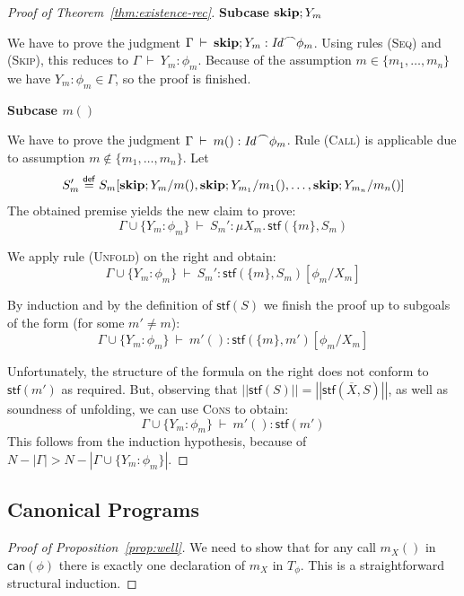 \documentclass[10pt,a4paper]{amsart}
\theoremstyle{definition}
\newcommand{\defeq}{\stackrel{\mathsf{def}}{=}}
\newcommand{\fdenot}[1]{\left|\!\left|#1\right|\!\right|}
\newcommand{\chop}[0]{\raisebox{1ex}{$\frown$}}
\newcommand{\stfs}[1]{\mathsf{stf} (#1)}
\newcommand{\stfh}[2]{\mathsf{stf}(#1, #2)}
\newcommand{\can}[1]{\mathsf{can} (#1)}
\newcommand{\Skip}{\mbox{\bf skip}}
\newcommand{\judge}[2]{#1 : #2}
\newcommand{\sequent}[2]{#1 \>\vdash\> #2}
\begin{document}
\begin{proof}[Proof of Theorem~\ref{thm:existence-rec}]
  \noindent\textbf{Subcase $\Skip;Y_m$} 

  We have to prove the judgment
  $\sequent{\Gamma}{\judge{\Skip;Y_m}{\mathit{Id} \chop \phi_m}}$.
  Using rules (\textsc{Seq}) and (\textsc{Skip}), this reduces to
  $\sequent{\Gamma}{\judge{Y_m}{\phi_m}}$.  Because of the assumption
  $m\in\{m_1,\ldots,m_n\}$ we have $\judge{Y_m}{\phi_m}\in\Gamma$, so
  the proof is finished.
  
  \noindent\textbf{Subcase $m()$}

  We have to prove the judgment
  $\sequent{\Gamma}{\judge{m()}{\mathit{Id}\chop\phi_m}}$.  Rule
  (\textsc{Call}) is applicable due to assumption
  $m\not\in\{m_1,\ldots,m_n\}$.
  Let
  \[
    S_m'\defeq S_m[\Skip;Y_m/m(),\Skip;Y_{m_1}/m_1(),\ldots,\Skip;Y_{m_n}/m_n()]
  \]
  The obtained premise yields the new claim to prove:
  \[
    \sequent{\Gamma\cup\{\judge{Y_m}{\phi_m}\}}{\judge{S_m'}{\mu
        X_m.\,\stfh{\{m\}}{S_m}}}
  \]

  We apply rule (\textsc{Unfold}) on the right and obtain:
  \[
    \sequent{\Gamma\cup\{\judge{Y_m}{\phi_m}\}}{\judge{S_m'}{\stfh{\{m\}}{S_m}[\phi_m/X_m]}}
  \]

  By induction and by the definition of $\stfs{S}$ we finish the proof
  up to subgoals of the form (for some $m'\neq m$):
  \[
    \sequent{\Gamma\cup\{\judge{Y_m}{\phi_m}\}}{\judge{m'()}{\stfh{\{m\}}{m'}[\phi_m/X_m]}}
  \]
  
  Unfortunately, the structure of the formula on the right does not
  conform to $\stfs{m'}$ as required.
  But, observing that
  $\fdenot{\stfs{S}} = \fdenot{\stfh{\overline{X}}{S}}$,
  as well as soundness of unfolding, we can use \textsc{Cons} to
  obtain:
  \[
    \sequent{\Gamma\cup\{\judge{Y_m}{\phi_m}\}}{\judge{m'()}{\stfs{m'}}}
  \]  
  This follows from the induction hypothesis, because of
  $N-\left|\Gamma\right|>N-\left|\Gamma\cup\{\judge{Y_m}{\phi_m}\}\right|$.

\end{proof}

\subsection{Canonical Programs}
\label{sec:canonical-programs-app}

\begin{proof}[Proof of Proposition~\ref{prop:well}]
  We need to show that for any call $m_X()$ in $\can{\phi}$ there is
  exactly one declaration of $m_X$ in $T_\phi$. This is a
  straightforward structural induction. %
\end{proof}
\end{document}

